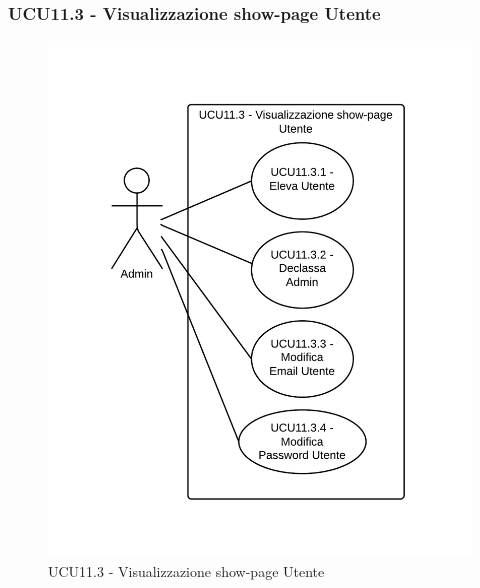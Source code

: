 \subsubsection{UCU11.3 - Visualizzazione show-page Utente} 
    \begin{figure}[H]
      \includegraphics[width=12cm]{UML/UCU11.3 - Visualizzazione show-page Utente.png}
      \caption{UCU11.3 - Visualizzazione show-page Utente} 
    \end{figure}
    
